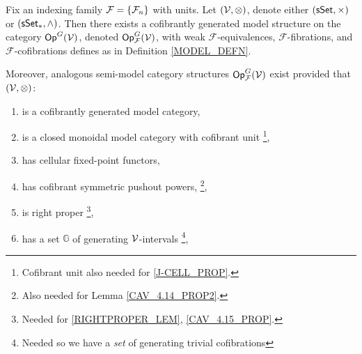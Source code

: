 \documentclass[a4paper,10pt
]{article}%
\renewcommand{\F}{\mathcal F}
\renewcommand{\1}{\ensuremath{\mathbb{id}}}
\begin{document}
\begin{theorem}
      \label{MODEL_THM}
      Fix an indexing family $\F = \set{\F_n}$ with units.
      Let $(\mathcal V, \otimes)$, denote either $(\mathsf{sSet}, \times)$ or $(\sSet_{\**}, \wedge)$.
      Then there exists a cofibrantly generated model structure on the category $\mathsf{Op}^G(\mathcal V)$,
      denoted $\Op^G_\F(\V)$, with
      weak $\F$-equivalences, $\F$-fibrations, and $\F$-cofibrations defines as in Definition \ref{MODEL_DEFN}.
           
      Moreover, analogous semi-model category structures $\Op^G_\F(\V)$ exist
      provided that $(\mathcal V, \otimes)$:
      \begin{enumerate}[label = (\roman*)]\itemsep-4pt
      \item is a cofibrantly generated model category,
      \item is a closed monoidal model category with cofibrant unit
            \footnote{Cofibrant unit also needed for \ref{J-CELL_PROP}.},
      \item has cellular fixed-point functors,
      \item \label{CSPP_LBL} has cofibrant symmetric pushout powers,
            \footnote{Also needed for Lemma \ref{CAV_4.14_PROP2}.},            
      \item \label{RP_LBL} is right proper
            \footnote{Needed for \ref{RIGHTPROPER_LEM}, \ref{CAV_4.15_PROP}.},
      \item \label{GENSET_LBL} has a set $\mathbb{G}$ of generating $\mathcal V$-intervals
            \footnote{Needed so we have a \textit{set} of generating trivial cofibrations},
      \end{enumerate}
\end{theorem}
\end{document}
